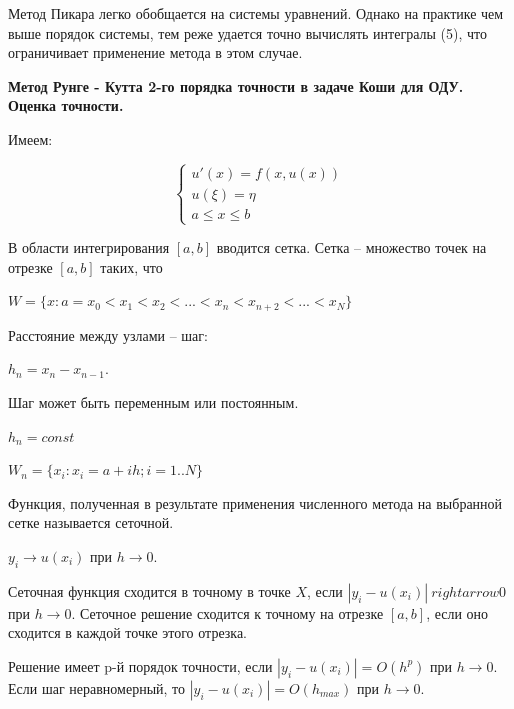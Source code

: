 \documentclass[a4paper,14pt]{article}
\begin{document}
Метод Пикара легко обобщается на системы уравнений. Однако на практике 
чем выше порядок системы, тем реже удается точно вычислять 
интегралы (5), что ограничивает применение метода в этом случае.

\textbf{Метод Рунге - Кутта 2-го порядка точности в задаче Коши для  ОДУ.  Оценка точности.}

Имеем:

\begin{equation}
	\begin{cases}
		u'(x) = f(x, u(x)) \\
		u(\xi) = \eta \\
		a \leq x \leq b
	\end{cases}
\end{equation}

\begin{figure}[!h]
	\label{fig:setka}
\end{figure}

В области интегрирования $[a, b]$ вводится сетка. Сетка -- множество
точек на отрезке $[a, b]$ таких, что 

$W = \{ x : a = x_0 < x_1 < x_2 < ... < x_n < x_{n+2} < ... < x_N \}$

Расстояние между узлами -- шаг:

$h_n = x_n - x_{n-1}$.

Шаг может быть переменным или постоянным.

$h_n = const$

$W_n = \{ x_i : x_i = a + i h; i = 1..N \}$

Функция, полученная в результате применения численного метода на выбранной сетке
называется сеточной. 

$y_i \rightarrow u(x_i)$ при $h \rightarrow 0$.

Сеточная функция сходится в точному в точке $X$, если
$|y_i - u(x_i)| \ rightarrow 0$ при $h \rightarrow 0$. 
Сеточное решение сходится к точному на отрезке $[a, b]$, если
оно сходится в каждой точке этого отрезка.

Решение имеет p-й порядок точности, если $|y_i - u(x_i)| = O(h^p)$ при $h \rightarrow 0$. Если шаг неравномерный, то 
$|y_i - u(x_i)| = O(h_{max})$ при $h \rightarrow 0$.
\end{document}
